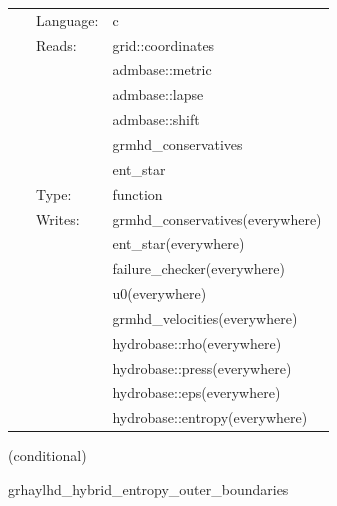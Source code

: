 \documentclass{article}
\begin{document}
 \begin{tabular*}{160mm}{cll} 
~ & Language:  & c \\ 
~ & Reads:  & grid::coordinates \\ 
~& ~ &admbase::metric\\ 
~& ~ &admbase::lapse\\ 
~& ~ &admbase::shift\\ 
~& ~ &grmhd\_conservatives\\ 
~& ~ &ent\_star\\ 
~ & Type:  & function \\ 
~ & Writes:  & grmhd\_conservatives(everywhere) \\ 
~& ~ &ent\_star(everywhere)\\ 
~& ~ &failure\_checker(everywhere)\\ 
~& ~ &u0(everywhere)\\ 
~& ~ &grmhd\_velocities(everywhere)\\ 
~& ~ &hydrobase::rho(everywhere)\\ 
~& ~ &hydrobase::press(everywhere)\\ 
~& ~ &hydrobase::eps(everywhere)\\ 
~& ~ &hydrobase::entropy(everywhere)\\ 
\end{tabular*} 


\vspace{5mm}

   (conditional) 

\hspace{5mm} grhaylhd\_hybrid\_entropy\_outer\_boundaries 

\hspace{5mm}{\it entropy+hybrid version of grhaylhd\_outer\_boundaries } 


\hspace{5mm}
\end{document}
